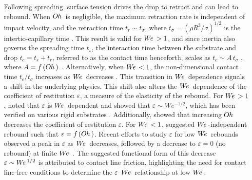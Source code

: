 \documentclass{jfm}
\newcommand{\We}{W\kern-0.15em e\,}
\newcommand{\Oh}{O\kern-0.05em h\,}
\begin{document}
Following spreading, surface tension drives the drop to retract and can lead to rebound. When $\Oh$ is negligible, the maximum retraction rate is independent of impact velocity, and the retraction time $t_{r} \sim t_{\sigma}$, where $t_{\sigma}=\left( \rho R^{3} / \sigma \right)^{1/2}$ is the intertio-capillary time \citep{bartolo2005retraction}. This result is valid for $\We>1$, and since inertia also governs the spreading time $t_s$, the interaction time between the substrate and drop $t_{c}=t_{s}+t_{r}$, referred to as the contact time henceforth, scales as $t_c \sim A \, t_{\sigma}$ \citep{richard2002contact}, where $A=f\left(\Oh\right)$ \citep{jha2020viscous}. Alternatively, when $\We<1$, the non-dimensional contact time $t_c/t_{\sigma}$ increases as $\We$ decreases \citep{foote1975water,okumura2003water}. This transition in $\We$ dependence signals a shift in the underlying physics. This shift also alters the $\We$ dependence of the coefficient of restitution $\varepsilon$, a measure of the elasticity of the rebound. For $\We>1$, \citet{anders1993velocity} noted that $\varepsilon$ is $\We$ dependent and \citet{biance2006elasticity} showed that $\varepsilon \sim We^{-1/2}$, which has been verified on various rigid substrates \citep{wang2022successive,thenarianto2023energy}. Additionally, \citet{jha2020viscous} showed that increasing $\Oh$ decreases the coefficient of restitution $\varepsilon$. For $\We<1$, \citet{gilet2012droplets} suggested $\We$-independent rebound such that $\varepsilon = f \left( \Oh \right)$. Recent efforts to study $\varepsilon$ for low $\We$ rebounds observed a peak in $\varepsilon$ as $\We$ decreases, followed by a decrease to $\varepsilon = 0$ (no rebound) at finite $\We$ \citep{wang2022successive,thenarianto2023energy}. The suggested functional form of this decrease $\varepsilon \sim \We^{1/2}$ is attributed to contact line friction, highlighting the need for contact line-free conditions to determine the $\varepsilon$–$\We$ relationship at low $\We$.
\end{document}
